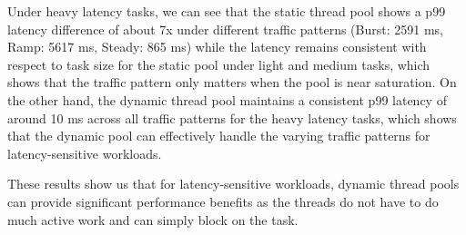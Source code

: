 \documentclass[sigconf, 10pt]{acmart}
\begin{document}
Under heavy latency tasks, we can see that the static thread pool shows a p99 latency difference of about 7x under different traffic patterns (Burst: 2591 ms, Ramp: 5617 ms, Steady: 865 ms) while the latency remains consistent with respect to task size for the static pool under light and medium tasks, which shows that the traffic pattern only matters when the pool is near saturation.
On the other hand, the dynamic thread pool maintains a consistent p99 latency of around 10 ms across all traffic patterns for the heavy latency tasks, which shows that the dynamic pool can effectively handle the varying traffic patterns for latency-sensitive workloads.

These results show us that for latency-sensitive workloads, dynamic thread pools can provide significant performance benefits as the threads do not have to do much active work and can simply block on the task.
\end{document}
